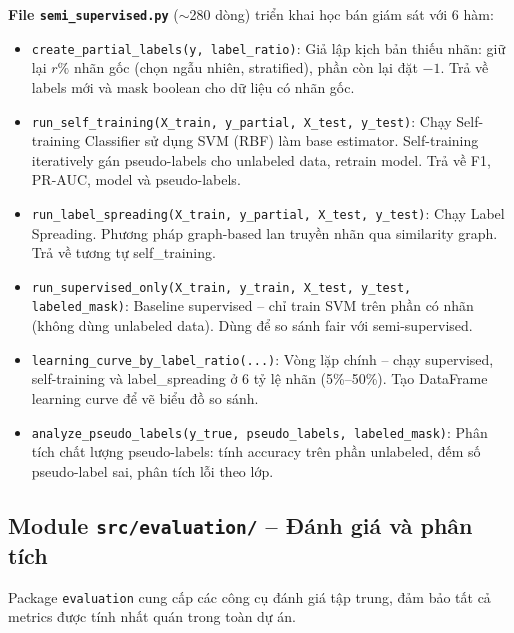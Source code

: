 \textbf{File \texttt{semi\_supervised.py}} ($\sim$280 dòng) triển khai học bán giám sát với 6 hàm:
\begin{itemize}
    \item \texttt{create\_partial\_labels(y, label\_ratio)}: Giả lập kịch bản thiếu nhãn: giữ lại $r\%$ nhãn gốc (chọn ngẫu nhiên, stratified), phần còn lại đặt $-1$. Trả về labels mới và mask boolean cho dữ liệu có nhãn gốc.
    \item \texttt{run\_self\_training(X\_train, y\_partial, X\_test, y\_test)}: Chạy Self-training Classifier sử dụng SVM (RBF) làm base estimator. Self-training iteratively gán pseudo-labels cho unlabeled data, retrain model. Trả về F1, PR-AUC, model và pseudo-labels.
    \item \texttt{run\_label\_spreading(X\_train, y\_partial, X\_test, y\_test)}: Chạy Label Spreading. Phương pháp graph-based lan truyền nhãn qua similarity graph. Trả về tương tự self\_training.
    \item \texttt{run\_supervised\_only(X\_train, y\_train, X\_test, y\_test, labeled\_mask)}: Baseline supervised -- chỉ train SVM trên phần có nhãn (không dùng unlabeled data). Dùng để so sánh fair với semi-supervised.
    \item \texttt{learning\_curve\_by\_label\_ratio(...)}: Vòng lặp chính -- chạy supervised, self-training và label\_spreading ở 6 tỷ lệ nhãn (5\%--50\%). Tạo DataFrame learning curve để vẽ biểu đồ so sánh.
    \item \texttt{analyze\_pseudo\_labels(y\_true, pseudo\_labels, labeled\_mask)}: Phân tích chất lượng pseudo-labels: tính accuracy trên phần unlabeled, đếm số pseudo-label sai, phân tích lỗi theo lớp.
\end{itemize}

\subsection{Module \texttt{src/evaluation/} -- Đánh giá và phân tích}

Package \texttt{evaluation} cung cấp các công cụ đánh giá tập trung, đảm bảo tất cả metrics được tính nhất quán trong toàn dự án.

